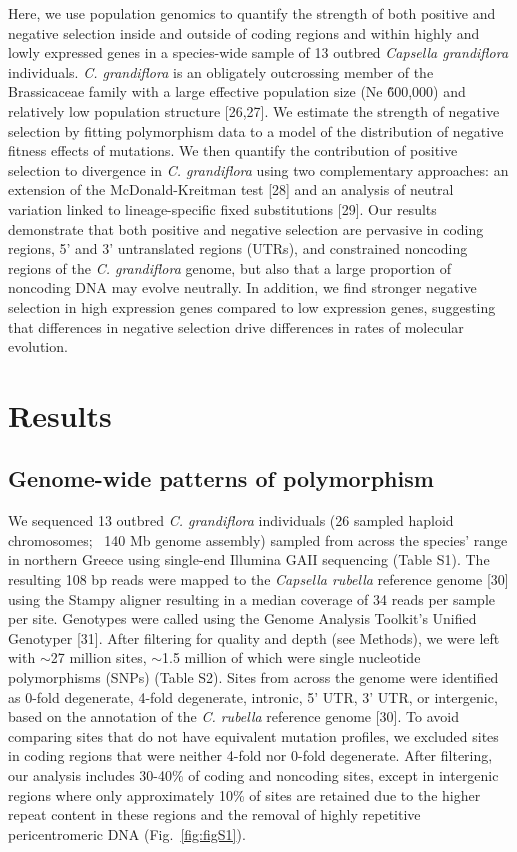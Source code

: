 Here, we use population genomics to quantify the strength of both positive and negative selection inside and outside of coding regions and within highly and lowly expressed genes in a species-wide sample of 13 outbred \textit{Capsella grandiflora} individuals. \textit{C. grandiflora} is an obligately outcrossing member of the Brassicaceae family with a large effective population size (Ne \~ 600,000) and relatively low population structure [26,27]. We estimate the strength of negative selection by fitting polymorphism data to a model of the distribution of negative fitness effects of mutations. We then quantify the contribution of positive selection to divergence in \textit{C. grandiflora} using two complementary approaches: an extension of the McDonald-Kreitman test [28] and an analysis of neutral variation linked to lineage-specific fixed substitutions [29]. Our results demonstrate that both positive and negative selection are pervasive in coding regions, 5’ and 3’ untranslated regions (UTRs), and constrained noncoding regions of the \textit{C. grandiflora} genome, but also that a large proportion of noncoding DNA may evolve neutrally. In addition, we find stronger negative selection in high expression genes compared to low expression genes, suggesting that differences in negative selection drive differences in rates of molecular evolution.

\section{Results}
\subsection{Genome-wide patterns of polymorphism}

We sequenced 13 outbred \textit{C. grandiflora} individuals (26 sampled haploid chromosomes; ~140 Mb genome assembly) sampled from across the species' range in northern Greece using single-end Illumina GAII sequencing (Table S1). The resulting 108 bp reads were mapped to the \textit{Capsella rubella} reference genome [30] using the Stampy aligner resulting in a median coverage of 34 reads per sample per site. Genotypes were called using the Genome Analysis Toolkit’s Unified Genotyper [31]. After filtering for quality and depth (see Methods), we were left with $\sim$27 million sites, $\sim$1.5 million of which were single nucleotide polymorphisms (SNPs) (Table S2). Sites from across the genome were identified as 0-fold degenerate, 4-fold degenerate, intronic, 5’ UTR, 3’ UTR, or intergenic, based on the annotation of the \textit{C. rubella} reference genome [30]. To avoid comparing sites that do not have equivalent mutation profiles, we excluded sites in coding regions that were neither 4-fold nor 0-fold degenerate. After filtering, our analysis includes 30-40\% of coding and noncoding sites, except in intergenic regions where only approximately 10\% of sites are retained due to the higher repeat content in these regions and the removal of highly repetitive pericentromeric DNA (Fig.~\ref{fig:figS1}). 

